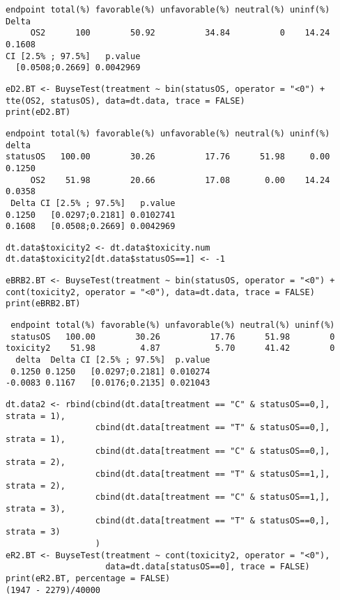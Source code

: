 \documentclass[12pt]{article}
\begin{document}
\begin{verbatim}
endpoint total(%) favorable(%) unfavorable(%) neutral(%) uninf(%)  Delta
     OS2      100        50.92          34.84          0    14.24 0.1608
CI [2.5% ; 97.5%]   p.value
  [0.0508;0.2669] 0.0042969
\end{verbatim}



\lstset{language=r,label= ,caption= ,captionpos=b,numbers=none}
\begin{lstlisting}
eD2.BT <- BuyseTest(treatment ~ bin(statusOS, operator = "<0") + tte(OS2, statusOS), data=dt.data, trace = FALSE)
print(eD2.BT)
\end{lstlisting}

\begin{verbatim}
endpoint total(%) favorable(%) unfavorable(%) neutral(%) uninf(%)  delta
statusOS   100.00        30.26          17.76      51.98     0.00 0.1250
     OS2    51.98        20.66          17.08       0.00    14.24 0.0358
 Delta CI [2.5% ; 97.5%]   p.value
0.1250   [0.0297;0.2181] 0.0102741
0.1608   [0.0508;0.2669] 0.0042969
\end{verbatim}



\lstset{language=r,label= ,caption= ,captionpos=b,numbers=none}
\begin{lstlisting}
dt.data$toxicity2 <- dt.data$toxicity.num
dt.data$toxicity2[dt.data$statusOS==1] <- -1
\end{lstlisting}

\lstset{language=r,label= ,caption= ,captionpos=b,numbers=none}
\begin{lstlisting}
eBRB2.BT <- BuyseTest(treatment ~ bin(statusOS, operator = "<0") + cont(toxicity2, operator = "<0"), data=dt.data, trace = FALSE)
print(eBRB2.BT)
\end{lstlisting}

\begin{verbatim}
 endpoint total(%) favorable(%) unfavorable(%) neutral(%) uninf(%)
 statusOS   100.00        30.26          17.76      51.98        0
toxicity2    51.98         4.87           5.70      41.42        0
  delta  Delta CI [2.5% ; 97.5%]  p.value
 0.1250 0.1250   [0.0297;0.2181] 0.010274
-0.0083 0.1167   [0.0176;0.2135] 0.021043
\end{verbatim}


\lstset{language=r,label= ,caption= ,captionpos=b,numbers=none}
\begin{lstlisting}
dt.data2 <- rbind(cbind(dt.data[treatment == "C" & statusOS==0,], strata = 1),
                  cbind(dt.data[treatment == "T" & statusOS==0,], strata = 1),
                  cbind(dt.data[treatment == "C" & statusOS==0,], strata = 2),
                  cbind(dt.data[treatment == "T" & statusOS==1,], strata = 2),
                  cbind(dt.data[treatment == "C" & statusOS==1,], strata = 3),
                  cbind(dt.data[treatment == "T" & statusOS==0,], strata = 3)
                  )
eR2.BT <- BuyseTest(treatment ~ cont(toxicity2, operator = "<0"),
                    data=dt.data[statusOS==0], trace = FALSE)
print(eR2.BT, percentage = FALSE)
(1947 - 2279)/40000
\end{lstlisting}
\end{document}
